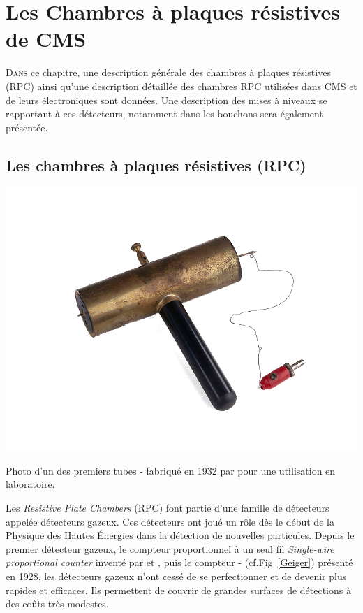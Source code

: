\chapter{Les Chambres à plaques résistives de CMS}
\renewcommand\chapterillustration{RPC/rpc}
\ThisULCornerWallPaper{1}{\chapterillustration}
\minitoc
\label{chap4}
\lettrine[lines=4, slope=-0.5em]{D}{ans} ce chapitre, une description générale des chambres à plaques résistives (RPC) ainsi qu'une description détaillée des chambres RPC utilisées dans CMS et de leurs électroniques sont données. Une description des mises à niveaux se rapportant à ces détecteurs, notamment dans les bouchons sera également présentée.

\section{Les chambres à plaques résistives (RPC)}

 \marginpar
{
	\centering
	\includegraphics[width=\marginparwidth]{RPC/Geiger.png}
	\captionsetup{type=subfigure}\caption{Photo d'un des premiers tubes - fabriqué en \num{1932} par  pour une utilisation en laboratoire.}
	\label{Geiger}
}
Les \textit{Resistive Plate Chambers} (RPC) font partie d'une famille de détecteurs appelée détecteurs gazeux. Ces détecteurs ont joué un rôle dès le début de la Physique des Hautes Énergies dans la détection de nouvelles particules. Depuis le premier détecteur gazeux, le compteur proportionnel à un seul fil \textit{Single-wire proportional counter} inventé par  et , puis le compteur - (cf.Fig~\ref{Geiger}) présenté en \num{1928}, les détecteurs gazeux n'ont cessé de se perfectionner et de devenir plus rapides et efficaces. Ils permettent de couvrir de grandes surfaces de détections à des coûts très modestes.


